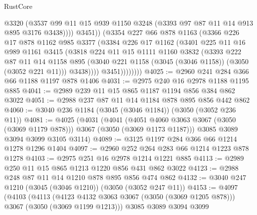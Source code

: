 \begin{lexlean}{RustCore}
\begin{coremodule}
                        @3320
                        (@3537
                          @99
                          @11
                          @15
                          @939
                          @1150
                          @3248
                          (@3393 @97 @87 @11 @14 @913 @895 @3176 @3438))))
                    @3451))
                (@3354
                  @227
                  @66
                  @878
                  @1163
                  (@3366
                    @226
                    @17
                    @878
                    @1162
                    @985
                    @3377
                    (@3384
                      @226
                      @17
                      @1162
                      (@3401
                        @225
                        @11
                        @16
                        @989
                        @1161
                        @3415
                        (@3818
                          @224
                          @11
                          @15
                          @1111
                          @1160
                          @3832
                          (@3393
                            @222
                            @87
                            @11
                            @14
                            @1158
                            @895
                            (@3040 @221 @1158 (@3045 (@3046 @1158)) (@3050 (@3052 @221 @11)))
                            @3438))))
                    @3451))))))))
@4025 := @2960 @241 @284 @366 @66 @1188 @1197 @878 @1406
@4031 := @2975 @240 @16 @2978 @1188 @1195 @885
@4041 := @2989 @239 @11 @15 @865 @1187 @1194 @856 @384 @862 @3022
@4051 := @2988 @237 @87 @11 @14 @1184 @878 @895 @856 @442 @862
@4060 := @3040 @236 @1184 (@3045 (@3046 @1184)) (@3050 (@3052 @236 @11))
@4081 := @4025
    (@4031
      (@4041 (@4051 @4060 @3063 @3067 (@3050 (@3069 @1179 @878))) @3067 (@3050 (@3069 @1173 @1187)))
      @3085
      @3089
      @3094
      @3099
      @3105
      @3114)
@4089 := @3125 @1197 @284 @366 @66 @1214 @1278 @1296 @1404
@4097 := @2960 @252 @264 @283 @66 @1214 @1223 @878 @1278
@4103 := @2975 @251 @16 @2978 @1214 @1221 @885
@4113 := @2989 @250 @11 @15 @865 @1213 @1220 @856 @431 @862 @3022
@4123 := @2988 @248 @87 @11 @14 @1210 @878 @895 @856 @474 @862
@4132 := @3040 @247 @1210 (@3045 (@3046 @1210)) (@3050 (@3052 @247 @11))
@4153 := @4097
    (@4103
      (@4113 (@4123 @4132 @3063 @3067 (@3050 (@3069 @1205 @878))) @3067 (@3050 (@3069 @1199 @1213)))
      @3085
      @3089
      @3094
      @3099

\end{coremodule}
\end{lexlean}
